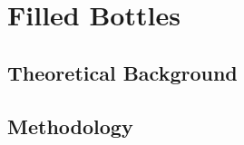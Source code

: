 \documentclass[a4paper,12pt]{article}
\begin{document}
\newpage

\section{Filled Bottles}

\subsection{Theoretical Background}




\subsection{Methodology}

\end{document}

